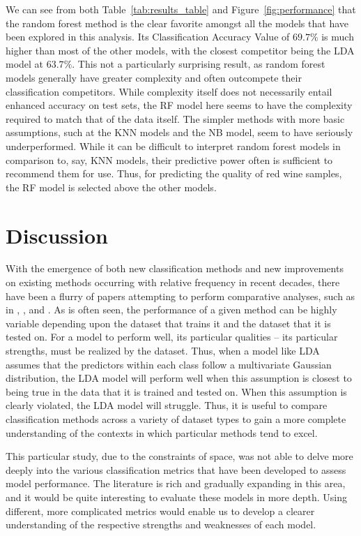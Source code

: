 \documentclass[12pt]{article}
\begin{document}
We can see from both Table~\ref{tab:results_table} and Figure~\ref{fig:performance} that 
the random forest method is the clear favorite amongst all the models that have been explored 
in this analysis.  Its Classification Accuracy Value of $69.7\%$ is much higher than most of 
the other models, with the closest competitor being the LDA model at $63.7\%$.  This not a 
particularly surprising result, as random forest models generally have greater complexity 
and often outcompete their classification competitors.  While complexity itself does not 
necessarily entail enhanced accuracy on test sets, the RF model here seems to have the 
complexity required to match that of the data itself.  The simpler methods with more basic 
assumptions, such at the KNN models and the NB model, seem to have seriously underperformed.  
While it can be difficult to interpret random forest models in comparison to, say, KNN models, 
their predictive power often is sufficient to recommend them for use.  Thus, for predicting 
the quality of red wine samples, the RF model is selected above the other models.  

\section{Discussion}
\label{sec:disc}

With the emergence of both new classification methods and new improvements on existing methods 
occurring with relative frequency in recent decades, there have been a flurry of papers 
attempting to perform comparative analyses, such as in \citep{alsafy2014multiclass}, 
\citep{khan2023comparison}, and \citep{szollHosi2012comparison}.  As is often seen, the 
performance of a given method can be highly variable depending upon the dataset that trains 
it and the dataset that it is tested on.  For a model to perform well, its particular 
qualities -- its particular strengths, must be realized by the dataset.  Thus, when a model 
like LDA assumes that the predictors within each class follow a multivariate Gaussian 
distribution, the LDA model will perform well when this assumption is closest to being true 
in the data that it is trained and tested on.  When this assumption is clearly violated, the 
LDA model will struggle.  Thus, it is useful to compare classification methods across a 
variety of dataset types to gain a more complete understanding of the contexts in which 
particular methods tend to excel.  

This particular study, due to the constraints of space, was not able to delve more deeply 
into the various classification metrics that have been developed to assess model performance.  
The literature is rich and gradually expanding in this area, and it would be quite interesting 
to evaluate these models in more depth.  Using different, more complicated metrics would enable 
us to develop a clearer understanding of the respective strengths and weaknesses of each model.
\end{document}
